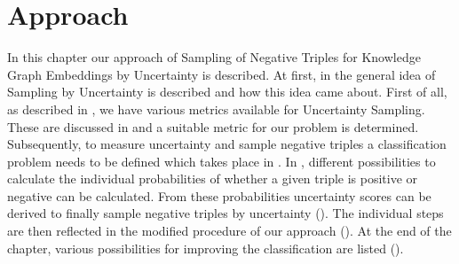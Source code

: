 \chapter{Approach}
\label{ch:approach}

In this chapter our approach of Sampling of Negative Triples for Knowledge Graph Embeddings by Uncertainty is described.
At first, in  the general idea of Sampling by Uncertainty is described and how this idea came about.
First of all, as described in , we have various metrics available for Uncertainty Sampling.
These are discussed in  and a suitable metric for our problem is determined.
Subsequently, to measure uncertainty and sample negative triples a classification problem needs to be defined which takes place in .
In , different possibilities to calculate the individual probabilities of whether a given triple is positive or negative can be calculated.
From these probabilities uncertainty scores can be derived to finally sample negative triples by uncertainty ().
The individual steps are then reflected in the modified procedure of our approach ().
At the end of the chapter, various possibilities for improving the classification are listed ().













